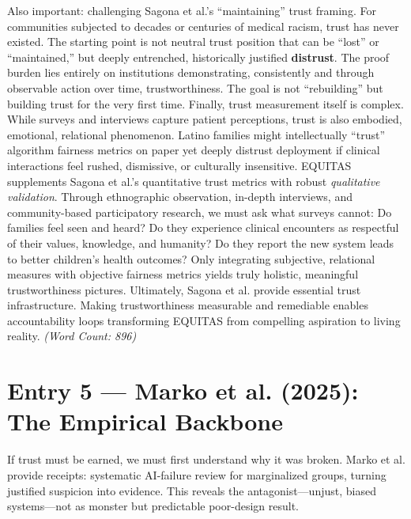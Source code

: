 \documentclass[11pt,twoside]{article}
\begin{document}
Also important: challenging Sagona et al.'s ``maintaining'' trust framing. For communities subjected to decades or centuries of medical racism, trust has never existed. The starting point is not neutral trust position that can be ``lost'' or ``maintained,'' but deeply entrenched, historically justified \textbf{distrust}. The proof burden lies entirely on institutions demonstrating, consistently and through observable action over time, trustworthiness. The goal is not ``rebuilding'' but building trust for the very first time. Finally, trust measurement itself is complex. While surveys and interviews capture patient perceptions, trust is also embodied, emotional, relational phenomenon. Latino families might intellectually ``trust'' algorithm fairness metrics on paper yet deeply distrust deployment if clinical interactions feel rushed, dismissive, or culturally insensitive. EQUITAS supplements Sagona et al.'s quantitative trust metrics with robust \textit{qualitative validation}. Through ethnographic observation, in-depth interviews, and community-based participatory research, we must ask what surveys cannot: Do families feel seen and heard? Do they experience clinical encounters as respectful of their values, knowledge, and humanity? Do they report the new system leads to better children's health outcomes? Only integrating subjective, relational measures with objective fairness metrics yields truly holistic, meaningful trustworthiness pictures. Ultimately, Sagona et al. provide essential trust infrastructure. Making trustworthiness measurable and remediable enables accountability loops transforming EQUITAS from compelling aspiration to living reality. \textit{(Word Count: 896)}

\newpage

\label{entry5}

\section*{Entry 5 --- Marko et al. (2025): The Empirical Backbone}

\vspace{-0.3cm}

If trust must be earned, we must first understand why it was broken. Marko et al. provide receipts: systematic AI-failure review for marginalized groups, turning justified suspicion into evidence. This reveals the antagonist---unjust, biased systems---not as monster but predictable poor-design result.

\vspace{-0.3cm}
\end{document}
